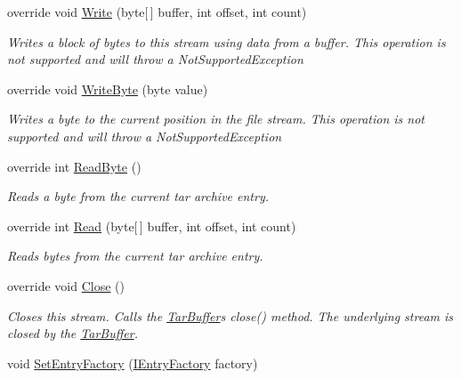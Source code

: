 \begin{DoxyCompactItemize}
override void \hyperlink{class_i_c_sharp_code_1_1_sharp_zip_lib_1_1_tar_1_1_tar_input_stream_ace04f178d60a3b6533a52f35e2e9491a}{Write} (byte\mbox{[}$\,$\mbox{]} buffer, int offset, int count)
\begin{DoxyCompactList}\small\item\em Writes a block of bytes to this stream using data from a buffer. This operation is not supported and will throw a Not\+Supported\+Exception \end{DoxyCompactList}\item 
override void \hyperlink{class_i_c_sharp_code_1_1_sharp_zip_lib_1_1_tar_1_1_tar_input_stream_a2b0ae4f029c710f3a217b2eef95ba4d5}{Write\+Byte} (byte value)
\begin{DoxyCompactList}\small\item\em Writes a byte to the current position in the file stream. This operation is not supported and will throw a Not\+Supported\+Exception \end{DoxyCompactList}\item 
override int \hyperlink{class_i_c_sharp_code_1_1_sharp_zip_lib_1_1_tar_1_1_tar_input_stream_a5028cafb46c015d0a44864d5fd8a79bd}{Read\+Byte} ()
\begin{DoxyCompactList}\small\item\em Reads a byte from the current tar archive entry. \end{DoxyCompactList}\item 
override int \hyperlink{class_i_c_sharp_code_1_1_sharp_zip_lib_1_1_tar_1_1_tar_input_stream_abbab3727270372439fd6c0646f66d431}{Read} (byte\mbox{[}$\,$\mbox{]} buffer, int offset, int count)
\begin{DoxyCompactList}\small\item\em Reads bytes from the current tar archive entry. \end{DoxyCompactList}\item 
override void \hyperlink{class_i_c_sharp_code_1_1_sharp_zip_lib_1_1_tar_1_1_tar_input_stream_a0e00dc015294bb80b69c144622a861e5}{Close} ()
\begin{DoxyCompactList}\small\item\em Closes this stream. Calls the \hyperlink{class_i_c_sharp_code_1_1_sharp_zip_lib_1_1_tar_1_1_tar_buffer}{Tar\+Buffer}\textquotesingle{}s close() method. The underlying stream is closed by the \hyperlink{class_i_c_sharp_code_1_1_sharp_zip_lib_1_1_tar_1_1_tar_buffer}{Tar\+Buffer}. \end{DoxyCompactList}\item 
void \hyperlink{class_i_c_sharp_code_1_1_sharp_zip_lib_1_1_tar_1_1_tar_input_stream_a9d78240fd9fa35d7855939ab89c84e47}{Set\+Entry\+Factory} (\hyperlink{interface_i_c_sharp_code_1_1_sharp_zip_lib_1_1_tar_1_1_tar_input_stream_1_1_i_entry_factory}{I\+Entry\+Factory} factory)

\end{DoxyCompactItemize}
